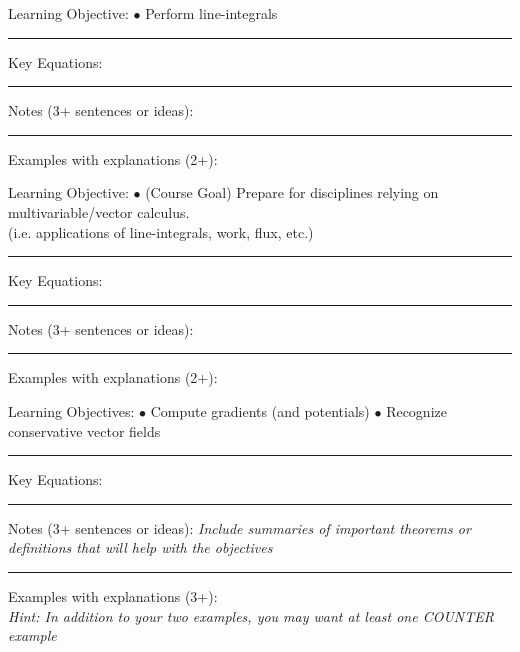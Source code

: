 \documentclass{article}
\theoremstyle{plain}
\theoremstyle{definition}
\theoremstyle{remark}
\begin{document}
\vskip-2pt
\noindent \large Learning Objective:
\normalsize
\vskip0.15in
$\bullet$ Perform line-integrals\\
\vskip0.15in
\hrule
\vspace{0.1in}
\large \noindent Key Equations:
\normalsize

\vspace{1in}
\hrule
\vspace{0.1in}
\large \noindent Notes (3+ sentences or ideas):
\normalsize
\vspace{1.75in}
\hrule
\vspace{0.1in}

\large \noindent Examples with explanations (2+):

\newpage
\noindent \large Learning Objective:
\normalsize
\vskip0.15in
$\bullet$ (Course Goal) Prepare for disciplines relying on multivariable/vector calculus. \\
\indent (i.e. applications of line-integrals, work, flux, etc.)
\vskip0.15in
\hrule
\vspace{0.1in}
\large \noindent Key Equations:
\normalsize

\vspace{1in}
\hrule
\vspace{0.1in}
\large \noindent Notes (3+ sentences or ideas):
\normalsize
\vspace{1.75in}
\hrule
\vspace{0.1in}

\large \noindent Examples with explanations (2+):

\newpage
\noindent \large Learning Objectives:
\normalsize
\vskip0.15in
$\bullet$ Compute gradients (and potentials) \hspace{0.1in}
$\bullet$ Recognize conservative vector fields
\vskip0.15in
\hrule
\vspace{0.1in}
\large \noindent Key Equations:
\normalsize

\vspace{1in}
\hrule
\vspace{0.1in}
\large \noindent Notes (3+ sentences or ideas):
\normalsize
\emph{Include summaries of important theorems or definitions that will help with the objectives}
\vspace{1.75in}
\hrule
\vspace{0.1in}

\large \noindent Examples with explanations (3+):\\
\normalsize
\emph{Hint: In addition to your two examples, you may want at least one COUNTER example}
\end{document}
